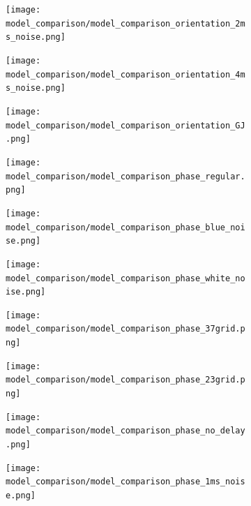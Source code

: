 \documentclass{article}
\begin{document}
\begin{figure}[htbp]
\begin{minipage}[t]{1\textwidth}
\begin{subfigure}{0.08\textwidth}
                \texttt{[image: model\_comparison/model\_comparison\_orientation\_2ms\_noise.png]}
            \end{subfigure}
            \begin{subfigure}{0.08\textwidth}
                \texttt{[image: model\_comparison/model\_comparison\_orientation\_4ms\_noise.png]}
            \end{subfigure}
            \begin{subfigure}{0.08\textwidth}
                \texttt{[image: model\_comparison/model\_comparison\_orientation\_GJ.png]}
            \end{subfigure}
        \end{minipage}
        \begin{minipage}[t]{1\textwidth}
            \centering
            \subcaption{}
            \begin{subfigure}{0.08\textwidth}
                \texttt{[image: model\_comparison/model\_comparison\_phase\_regular.png]}
            \end{subfigure}
            \begin{subfigure}{0.08\textwidth}
                \texttt{[image: model\_comparison/model\_comparison\_phase\_blue\_noise.png]}
            \end{subfigure}
            \begin{subfigure}{0.08\textwidth}
                \texttt{[image: model\_comparison/model\_comparison\_phase\_white\_noise.png]}
            \end{subfigure}
            \begin{subfigure}{0.08\textwidth}
                \texttt{[image: model\_comparison/model\_comparison\_phase\_37grid.png]}
            \end{subfigure}
            \begin{subfigure}{0.08\textwidth}
                \texttt{[image: model\_comparison/model\_comparison\_phase\_23grid.png]}
            \end{subfigure}
            \begin{subfigure}{0.08\textwidth}
                \texttt{[image: model\_comparison/model\_comparison\_phase\_no\_delay.png]}
            \end{subfigure}
            \begin{subfigure}{0.08\textwidth}
                \texttt{[image: model\_comparison/model\_comparison\_phase\_1ms\_noise.png]}
            \end{subfigure}
            \begin{subfigure}{0.08\textwidth}

\end{subfigure}
\end{minipage}
\end{figure}
\end{document}
